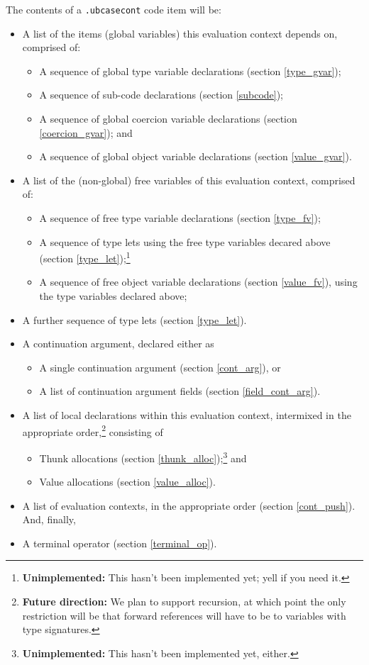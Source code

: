 \documentclass{report}
\newcommand\stringcode[1]{\texttt{#1}}
\newcommand\unimpl[1]{\footnote{\textbf{Unimplemented: }#1}}
\newcommand\future[1]{\footnote{\textbf{Future direction:} #1}}
\begin{document}
The contents of a \stringcode{.ubcasecont} code item will be:
\begin{itemize}
    \item A list of the items (global variables) this evaluation context depends on, comprised of:
        \begin{itemize}
            \item A sequence of global type variable declarations (section \ref{type_gvar});
            \item A sequence of sub-code declarations (section \ref{subcode});
            \item A sequence of global coercion variable declarations (section \ref{coercion_gvar}); and
            \item A sequence of global object variable declarations (section \ref{value_gvar}).
        \end{itemize}
    \item A list of the (non-global) free variables of this evaluation context, comprised of:
        \begin{itemize}
            \item A sequence of free type variable declarations (section \ref{type_fv});
            \item A sequence of type lets using the free type variables decared above (section \ref{type_let});\unimpl{This hasn't been implemented yet; yell if you need it.}
            \item A sequence of free object variable declarations (section \ref{value_fv}), using the type variables declared above;
        \end{itemize}
    \item A further sequence of type lets (section \ref{type_let}).
    \item A continuation argument, declared either as
        \begin{itemize}
            \item A single continuation argument (section \ref{cont_arg}), or
            \item A list of continuation argument fields (section \ref{field_cont_arg}).
        \end{itemize}
    \item A list of local declarations within this evaluation context,
        intermixed in the appropriate order,\future{We plan to support recursion, at which point the only restriction will be that forward references will have to be to variables with type signatures.}
        consisting of
        \begin{itemize}
            \item Thunk allocations (section \ref{thunk_alloc});\unimpl{This hasn't been implemented yet, either.} and
            \item Value allocations (section \ref{value_alloc}).
        \end{itemize}
    \item A list of evaluation contexts, in the appropriate order (section \ref{cont_push}).
        And, finally,
    \item A terminal operator (section \ref{terminal_op}).
\end{itemize}
\end{document}
